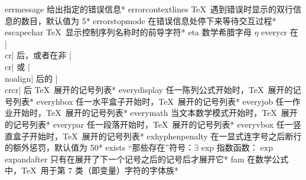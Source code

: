 \capcs errmessage {给出指定的错误信息}*{}
\capcs errorcontextlines {\TeX\ 遇到错误时显示的双行信息的数目，默认值为 5}*{}
\capcs errorstopmode {在错误信息处停下来等待交互过程}*{}
\capcs escapechar {\TeX\ 显示控制序列名称时的前导字符}*{}
\capcs eta {数学希腊字母 $\eta$}{}{}
\capcs everycr {在 |\\cr| 后，或者在非 |\\cr| 或 |\\noalign| 后的 |\\crcr| 后 \TeX\ 展开的记号列表}*{}
\capcs everydisplay {任一陈列公式开始时，\TeX\ 展开的记号列表}*{}
\capcs everyhbox {任一水平盒子开始时，\TeX\ 展开的记号列表}*{}
\capcs everyjob {任一作业开始时，\TeX\ 展开的记号列表}*{}
\capcs everymath {当文本数学模式开始时，\TeX\ 展开的记号列表}*{}
\capcs everypar {任一段落开始时，\TeX\ 展开的记号列表}*{}
\capcs everyvbox {任一竖直盒子开始时，\TeX\ 展开的记号列表}*{}
\capcs exhyphenpenalty {在一显式连字号之后断行的额外惩罚，默认值为 50}*{}
\capcs exists {“那些存在”符号：$\exists$}{}{}
\capcs exp {指数函数：$\exp$}{}{}
\capcs expandafter {只有在展开了下一个记号之后的记号后才展开它}*{}
\capcs fam {在数学公式中，\TeX\ 用于第 $7$ 类（即变量）字符的字体族}*{}
